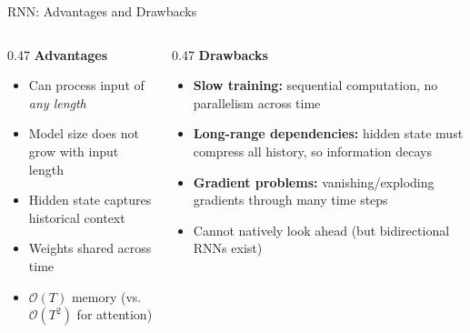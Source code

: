 \begin{frame}{RNN: Advantages and Drawbacks}
  \begin{columns}[T]
    \begin{column}{0.47\textwidth}
      \textbf{Advantages}
      \begin{itemize}
        \item Can process input of \emph{any length}
        \item Model size does not grow with input length
        \item Hidden state captures historical context
        \item Weights shared across time
        \item $\mathcal{O}(T)$ memory (vs.\ $\mathcal{O}(T^2)$ for attention)
      \end{itemize}
    \end{column}
    \begin{column}{0.47\textwidth}
      \textbf{Drawbacks}
      \begin{itemize}
        \item \textbf{Slow training:} sequential computation, no parallelism across time
        \item \textbf{Long-range dependencies:} hidden state must compress all history, so information decays
        \item \textbf{Gradient problems:} vanishing/exploding gradients through many time steps
        \item Cannot natively look ahead (but bidirectional RNNs exist)
      \end{itemize}
    \end{column}
  \end{columns}

\end{frame}

